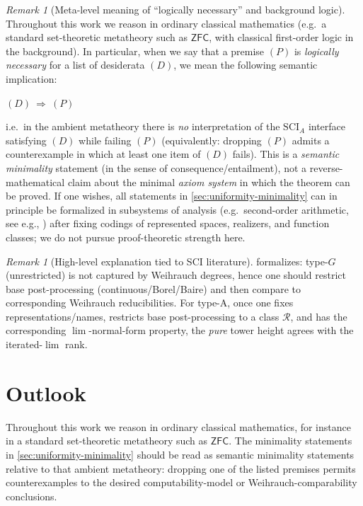 \documentclass{lmcs} %
\theoremstyle{plain}
\theoremstyle{plain}
\theoremstyle{definition}
\theoremstyle{remark}
\newtheorem{remark}[theorem]{Remark}
\theoremstyle{definition}
\theoremstyle{remark}
\numberwithin{equation}{section}
\newcommand{\Lim}{\operatorname{lim}}
\begin{document}
\begin{remark}[Meta-level meaning of \enquote{logically necessary} and background logic]\label{rem:logical-necessity}
Throughout this work we reason in ordinary classical mathematics (e.g.\ a standard set-theoretic
metatheory such as $\mathsf{ZFC}$, with classical first-order logic in the background).
In particular, when we say that a premise $(P)$ is \textit{logically necessary} for a list of
desiderata $(D)$, we mean the following semantic implication:

\smallskip
\centerline{$(D)\ \Longrightarrow\ (P)$}

\smallskip
i.e.\ in the ambient metatheory there is \textit{no} interpretation of the $\mathrm{SCI}_A$ interface
satisfying $(D)$ while failing $(P)$ (equivalently: dropping $(P)$ admits a counterexample in which
at least one item of $(D)$ fails).
This is a \textit{semantic minimality} statement (in the sense of consequence/entailment),
not a reverse-mathematical claim about the minimal \textit{axiom system} in which the theorem can be proved.
If one wishes, all statements in \cref{sec:uniformity-minimality} can in principle be formalized in subsystems of analysis
(e.g.\ second-order arithmetic, see e.g., \cite{simpson09secAr}) after fixing codings of represented spaces, realizers, and
function classes; we do not pursue proof-theoretic strength here.
\end{remark}

\begin{remark}[High-level explanation tied to SCI literature]
 formalizes:
type-$G$ (unrestricted) is not captured by Weihrauch degrees, hence one should restrict base post-processing
(continuous/Borel/Baire) and then compare to corresponding Weihrauch reducibilities.
For type-A, once one fixes representations/names, restricts base post-processing to
a class $\mathcal R$, and has the corresponding $\Lim$-normal-form property, the
\textit{pure} tower height agrees with the iterated-$\Lim$ rank.
\end{remark}

\section{Outlook}{\label{sec:outlook}}
Throughout this work we reason in ordinary classical mathematics, for instance in a standard set-theoretic metatheory such as $\mathsf{ZFC}$. The minimality statements in \cref{sec:uniformity-minimality} should be read as semantic minimality statements relative to that ambient metatheory: dropping one of the listed premises permits counterexamples to the desired computability-model or Weihrauch-comparability conclusions.
\end{document}
